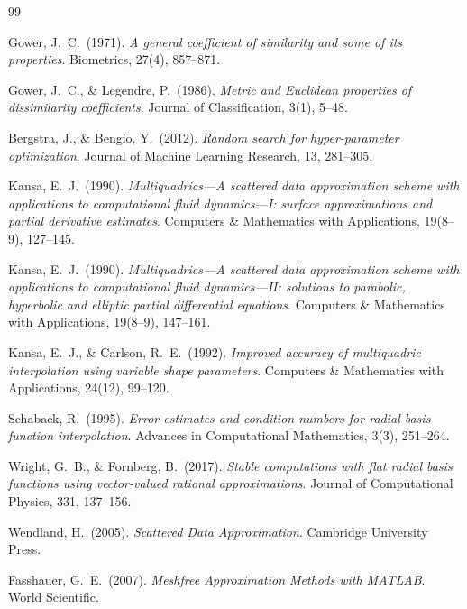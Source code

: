 \documentclass[11pt,a4paper]{article}
\begin{document}
\begin{thebibliography}{99}

Gower, J.\ C.\ (1971).
\emph{A general coefficient of similarity and some of its properties}.
Biometrics, 27(4), 857--871.

Gower, J.\ C., \& Legendre, P.\ (1986).
\emph{Metric and Euclidean properties of dissimilarity coefficients}.
Journal of Classification, 3(1), 5--48.

Bergstra, J., \& Bengio, Y.\ (2012).
\emph{Random search for hyper-parameter optimization}.
Journal of Machine Learning Research, 13, 281--305.

Kansa, E.\ J.\ (1990).
\emph{Multiquadrics---A scattered data approximation scheme with
applications to computational fluid dynamics---I: surface approximations
and partial derivative estimates}.
Computers \& Mathematics with Applications, 19(8--9), 127--145.

Kansa, E.\ J.\ (1990).
\emph{Multiquadrics---A scattered data approximation scheme with
applications to computational fluid dynamics---II: solutions to parabolic,
hyperbolic and elliptic partial differential equations}.
Computers \& Mathematics with Applications, 19(8--9), 147--161.

Kansa, E.\ J., \& Carlson, R.\ E.\ (1992).
\emph{Improved accuracy of multiquadric interpolation using variable shape
parameters}.
Computers \& Mathematics with Applications, 24(12), 99--120.

Schaback, R.\ (1995).
\emph{Error estimates and condition numbers for radial basis function
interpolation}.
Advances in Computational Mathematics, 3(3), 251--264.

Wright, G.\ B., \& Fornberg, B.\ (2017).
\emph{Stable computations with flat radial basis functions using
vector-valued rational approximations}.
Journal of Computational Physics, 331, 137--156.

Wendland, H.\ (2005).
\emph{Scattered Data Approximation}.
Cambridge University Press.

Fasshauer, G.\ E.\ (2007).
\emph{Meshfree Approximation Methods with MATLAB}.
World Scientific.

\end{thebibliography}
\end{document}
